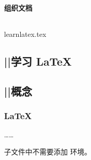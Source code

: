 \begin{frame}[fragile]
  \frametitle{组织文档}
  \begin{columns}
    \begin{column}{0.4\textwidth}
      \begin{codeblock}[]{learnlatex.tex}
\chapter{|\phantom{}|学习 \LaTeX{}}
\section{|\phantom{}|概念}
\subsection{\LaTeX{}}
……
      \end{codeblock}
      子文件中不需要添加  环境。
    \end{column}
    \begin{column}{0.6\textwidth}
    \end{column}
  \end{columns}
\end{frame}
